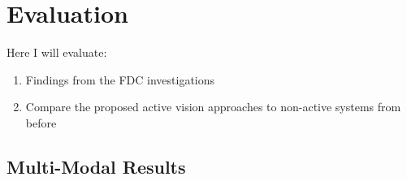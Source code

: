 \chapter{Evaluation}\label{ch:eval}
Here I will evaluate:
\begin{enumerate}
  \item Findings from the FDC investigations
  \item Compare the proposed active vision approaches to non-active systems from before
\end{enumerate}





\section{Multi-Modal Results}

  

  
  
  

  

  
  
  






